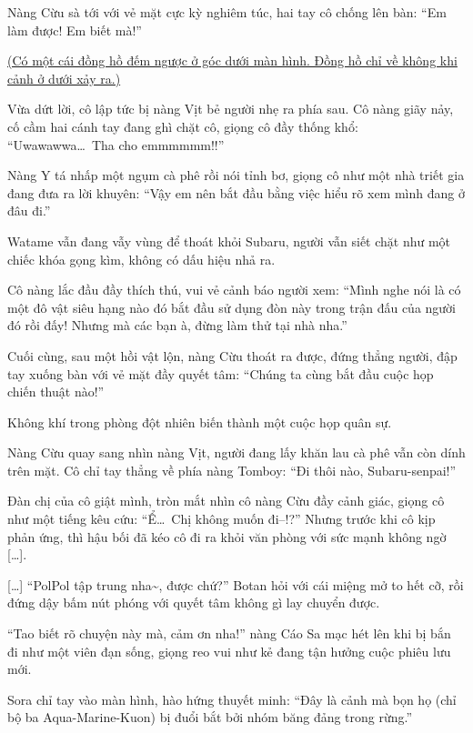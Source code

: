 \documentclass[../main.tex]{subfiles}
\begin{document}
Nàng Cừu sà tới với vẻ mặt cực kỳ nghiêm túc, hai tay cô chống lên bàn: ``Em làm được! Em biết mà!''

\begin{center}
  \uline{(Có một cái đồng hồ đếm ngược ở góc dưới màn hình. Đồng hồ chỉ về không khi cảnh ở dưới xảy ra.)}
\end{center}

Vừa dứt lời, cô lập tức bị nàng Vịt bẻ người nhẹ ra phía sau. Cô nàng giãy nảy, cố cầm hai cánh tay đang ghì chặt cô, giọng cô đầy thống khổ: ``Uwawawwa\dots\ Tha cho emmmmmm!!''

Nàng Y tá nhấp một ngụm cà phê rồi nói tỉnh bơ, giọng cô như một nhà triết gia đang đưa ra lời khuyên: ``Vậy em nên bắt đầu bằng việc hiểu rõ xem mình đang ở đâu đi.''


Watame vẫn đang vẫy vùng để thoát khỏi Subaru, người vẫn siết chặt như một chiếc khóa gọng kìm, không có dấu hiệu nhả ra.

Cô nàng lắc đầu đầy thích thú, vui vẻ cảnh báo người xem: ``Mình nghe nói là có một đô vật siêu hạng nào đó bắt đầu sử dụng đòn này trong trận đấu của người đó rồi đấy! Nhưng mà các bạn à, đừng làm thử tại nhà nha.''

Cuối cùng, sau một hồi vật lộn, nàng Cừu thoát ra được, đứng thẳng người, đập tay xuống bàn với vẻ mặt đầy quyết tâm: ``Chúng ta cùng bắt đầu cuộc họp chiến thuật nào!''

Không khí trong phòng đột nhiên biến thành một cuộc họp quân sự.

Nàng Cừu quay sang nhìn nàng Vịt, người đang lấy khăn lau cà phê vẫn còn dính trên mặt. Cô chỉ tay thẳng về phía nàng Tomboy: ``Đi thôi nào, Subaru-senpai!''

Đàn chị của cô giật mình, tròn mắt nhìn cô nàng Cừu đầy cảnh giác, giọng cô như một tiếng kêu cứu: ``Ể\dots\ Chị không muốn đi--!?'' Nhưng trước khi cô kịp phản ứng, thì hậu bối đã kéo cô đi ra khỏi văn phòng với sức mạnh không ngờ [\dots].


[\dots]  ``PolPol tập trung nha\~{}, được chứ?'' Botan hỏi với cái miệng mở to hết cỡ, rồi đứng dậy bấm nút phóng với quyết tâm không gì lay chuyển được.

``Tao biết rõ chuyện này mà, cảm ơn nha!'' nàng Cáo Sa mạc hét lên khi bị bắn đi như một viên đạn sống, giọng reo vui như kẻ đang tận hưởng cuộc phiêu lưu mới.

Sora chỉ tay vào màn hình, hào hứng thuyết minh: ``Đây là cảnh mà bọn họ (chỉ bộ ba Aqua-Marine-Kuon) bị đuổi bắt bởi nhóm băng đảng trong rừng.''
\end{document}

